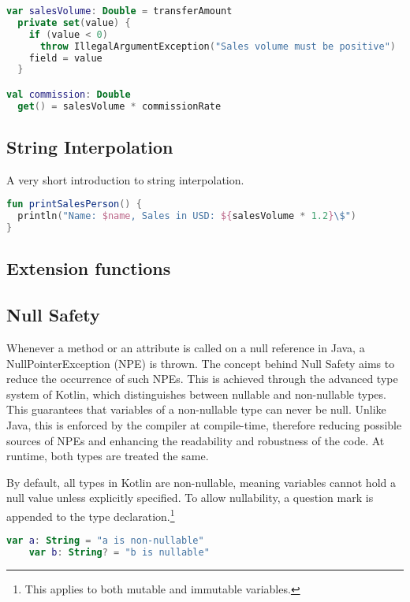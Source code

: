 \documentclass[a4paper, 11pt]{article}
\begin{document}
\begin{lstlisting}[language=Kotlin,title={Kotlin Properties}]
var salesVolume: Double = transferAmount
  private set(value) {
    if (value < 0)
      throw IllegalArgumentException("Sales volume must be positive")
    field = value
  }

val commission: Double
  get() = salesVolume * commissionRate
\end{lstlisting}

\subsection{String Interpolation}
A very short introduction to string interpolation.

\begin{lstlisting}[language=Kotlin,title={String Interpolation}]
fun printSalesPerson() {
  println("Name: $name, Sales in USD: ${salesVolume * 1.2}\$")
}
\end{lstlisting}

\subsection{Extension functions}

\subsection{Null Safety}
  Whenever a method or an attribute is called on a null reference in Java, a NullPointerException (NPE) is thrown. The concept behind Null Safety aims to reduce the occurrence of such NPEs. This is achieved through the advanced type system of Kotlin, which distinguishes between nullable and non-nullable types. This guarantees that variables of a non-nullable type can never be null. Unlike Java, this is enforced by the compiler at compile-time, therefore reducing possible sources of NPEs and enhancing the readability and robustness of the code. At runtime, both types are treated the same.
  
  By default, all types in Kotlin are non-nullable, meaning variables cannot hold a null value unless explicitly specified. To allow nullability, a question mark is appended to the type declaration.\footnote{This applies to both mutable and immutable variables.}

  \begin{lstlisting}[language=Kotlin]
    var a: String = "a is non-nullable"
    var b: String? = "b is nullable"
  \end{lstlisting}
  
\end{document}
